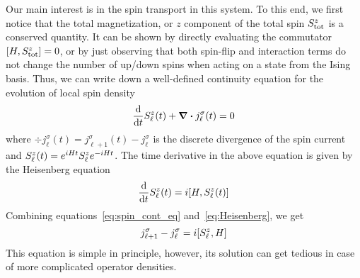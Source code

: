 Our main interest is in the spin transport in this system. To this end, we first notice that
the total magnetization, or \(z\) component of the total spin \(S^{z}_{\mathrm{tot}}\)
is a conserved quantity.
It can be shown by directly evaluating the commutator \(\comm{H}{\Sz_{\mathrm{tot}}}=0\), or by just observing
that both spin-flip and interaction terms do not change the number of up/down spins when acting on a state
from the Ising basis. Thus, we can write down a well-defined continuity equation for the evolution
of local spin density
\begin{equation}
    \dv{t} S^{z}_{\ell}(t) + \div{j^{\sigma}_{\ell}(t)} = 0
    \label{eq:spin_cont_eq}
\end{equation}
where \(\div{j^{\sigma}_{\ell}(t)} = j^{\sigma}_{\ell+1}(t) - j^{\sigma}_{\ell}\) is the
discrete divergence of the spin current and \(S^{z}_{\ell}(t) = e^{i H t} S^{z}_{\ell} e^{-i H t}\).
The time derivative in the above equation is given by the Heisenberg equation
\begin{equation}
    \dv{t} \Sz_{\ell}(t) = i \comm{H}{\Sz_{\ell}(t)}
    \label{eq:Heisenberg}
\end{equation}
Combining equations~\eqref{eq:spin_cont_eq} and~\eqref{eq:Heisenberg}, we get
\begin{equation}
    j^{\sigma}_{\ell+1} - j^{\sigma}_{\ell} = i\comm{\Sz_{\ell}}{H}
\end{equation}
This equation is simple in principle, however, its solution can get tedious in case of more complicated
operator densities.

